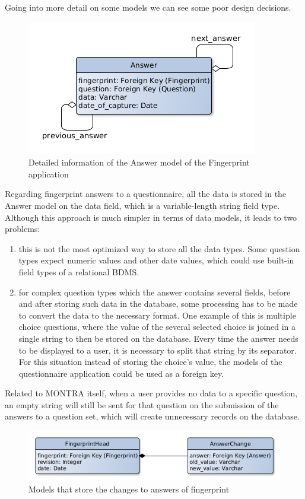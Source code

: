
Going into more detail on some models we can see some poor design decisions.

\begin{figure}[h]
    \center
    \includegraphics[width=.4\linewidth]{answer-model}
    \caption{Detailed information of the Answer model of the Fingerprint application}
    \label{fig:answer-model}
\end{figure}

Regarding fingerprint answers to a questionnaire, all the data is stored in the Answer model on the data field, which is a variable-length string field type.
Although this approach is much simpler in terms of data models, it leads to two problems:
\begin{enumerate}
    \item this is not the most optimized way to store all the data types.
        Some question types expect numeric values and other date values, which could use built-in field types of a relational BDMS.
    \item for complex question types which the answer contains several fields, before and after storing such data in the database, some processing has to be made to convert the data to the necessary format.
        One example of this is multiple choice questions, where the value of the several selected choice is joined in a single string to then be stored on the database.
        Every time the answer needs to be displayed to a user, it is necessary to split that string by its separator.
        For this situation instead of storing the choice's value, the models of the questionnaire application could be used as a foreign key.
\end{enumerate}

Related to MONTRA itself, when a user provides no data to a specific question, an empty string will still be sent for that question on the submission of the answers to a question set, which will create unnecessary records on the database.

\begin{figure}[h]
    \center
    \includegraphics[width=.6\linewidth]{answer-changes-models}
    \caption{Models that store the changes to answers of fingerprint}
    \label{fig:answer-changes-models}
\end{figure}

